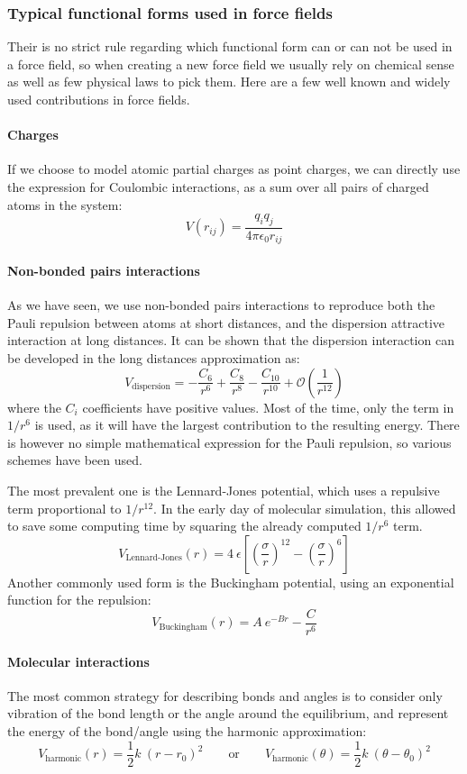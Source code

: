 \documentclass[thesis]{subfiles}
\begin{document}
\subsubsection{Typical functional forms used in force fields}

Their is no strict rule regarding which functional form can or can not be used
in a force field, so when creating a new force field we usually rely on
chemical sense as well as few physical laws to pick them. Here are a few well
known and widely used contributions in force fields.

\paragraph{Charges} If we choose to model atomic partial charges as point
charges, we can directly use the expression for Coulombic interactions, as a sum
over all pairs of charged atoms in the system:
\[ V(r_{ij}) = \frac{q_i q_j}{4 \pi \epsilon_0 r_{ij}}\]

\paragraph{Non-bonded pairs interactions} As we have seen, we use non-bonded
pairs interactions to reproduce both the Pauli repulsion between atoms at short
distances, and the dispersion attractive interaction at long distances. It can
be shown\cite{London1930} that the dispersion interaction can be developed in
the long distances approximation as:
\[ V_\text{dispersion} = -\frac{C_6}{r^6} + \frac{C_8}{r^8} - \frac{C_{10}}{r^{10}} + {\scriptstyle\mathcal{O}}\left(\frac{1}{r^{12}}\right) \]
where the $C_i$ coefficients have positive values. Most of the time, only the
term in $1/r^6$ is used, as it will have the largest contribution to the
resulting energy. There is however no simple mathematical expression for the
Pauli repulsion, so various schemes have been used.

The most prevalent one is the Lennard-Jones potential, which uses a repulsive
term proportional to $1/r^{12}$. In the early day of molecular simulation, this
allowed to save some computing time by squaring the already computed $1/r^6$ term.
\[V_\text{Lennard-Jones}(r) = 4 \ \epsilon \left[\left(\frac{\sigma}{r}\right)^{12} - \left(\frac{\sigma}{r}\right)^6\right]\]
Another commonly used form is the Buckingham potential, using an exponential
function for the repulsion:
\[V_\text{Buckingham}(r) = A \ e^{-B r} - \frac{C}{r^6}\]

\paragraph{Molecular interactions} The most common strategy for describing bonds
and angles is to consider only vibration of the bond length or the angle around
the equilibrium, and represent the energy of the bond/angle using the harmonic
approximation:
\[V_\text{harmonic}(r) = \frac 12 k \ (r - r_0)^2  \qquad\text{or}\qquad V_\text{harmonic}(\theta) = \frac 12 k \ (\theta - \theta_0)^2 \]
\end{document}
